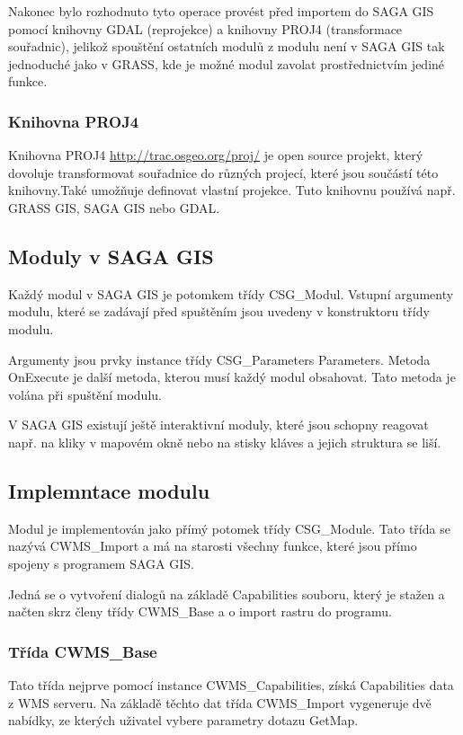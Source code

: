 \documentclass[a4paper,12pt]{article}
\begin{document}
Nakonec bylo rozhodnuto tyto operace provést před importem do SAGA GIS pomocí knihovny GDAL (reprojekce) a knihovny PROJ4 (transformace souřadnic), jelikož spouštění ostatních modulů z modulu není v SAGA GIS tak jednoduché jako v GRASS, kde je možné modul zavolat prostřednictvím jediné funkce. 

\subsubsection{Knihovna PROJ4}

Knihovna PROJ4 \url{http://trac.osgeo.org/proj/} je open source projekt, který dovoluje transformovat souřadnice do různých projecí, které jsou součástí této knihovny.Také umožňuje definovat vlastní 
projekce. Tuto knihovnu používá např. GRASS GIS, SAGA GIS nebo GDAL.

\subsection{Moduly v SAGA GIS}

Každý modul v SAGA GIS je potomkem třídy CSG\_Modul. Vstupní argumenty modulu, které se zadávají před spuštěním jsou uvedeny v konstruktoru třídy modulu.

Argumenty jsou prvky instance třídy CSG\_Parameters Parameters. 
Metoda OnExecute je další metoda, kterou musí každý modul obsahovat. Tato metoda je volána při spuštění modulu. 

V SAGA GIS existují ještě interaktivní moduly, které jsou schopny reagovat např. na kliky v mapovém okně nebo na stisky kláves a jejich struktura se liší.    


\subsection{Implemntace modulu}
Modul je implementován jako přímý potomek třídy CSG\_Module. Tato třída se nazývá CWMS\_Import a má na starosti všechny funkce, které jsou přímo spojeny s programem SAGA GIS.

Jedná se o vytvoření dialogů na základě Capabilities souboru, který je stažen a načten  skrz členy třídy CWMS\_Base a o import rastru do programu. 

\subsubsection{Třída CWMS\_Base}

Tato třída nejprve pomocí instance CWMS\_Capabilities, získá Capabilities data z WMS serveru. Na základě těchto dat třída CWMS\_Import vygeneruje dvě nabídky, ze kterých uživatel vybere parametry dotazu GetMap. 
\end{document}
